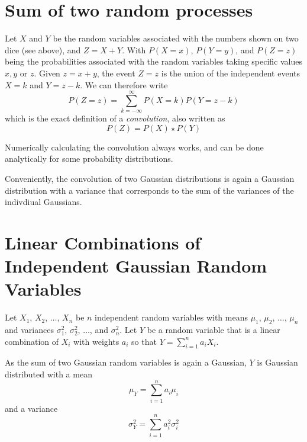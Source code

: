 \section{Sum of two random processes}\label{sec:convolution}
Let $X$ and $Y$ be the random variables associated with the numbers shown on two dice (see above), and $Z=X+Y$. With $P(X=x)$, $P(Y=y)$, and $P(Z=z)$ being the probabilities associated with the random variables taking specific values $x,y$ or $z$. Given $z=x+y$, the event $Z=z$ is the union of the independent events $X=k$ and $Y=z-k$. We can therefore write
\begin{equation}
P(Z=z)=\sum_{k=-\infty}^{\infty}P(X=k)P(Y=z-k)
\end{equation}
which is the exact definition of a \emph{convolution}, also written as
\begin{equation}
P(Z)=P(X)\star P(Y)
\end{equation}

Numerically calculating the convolution always works, and can be done analytically for some probability distributions.

Conveniently, the convolution of two Gaussian distributions is again a Gaussian distribution with a variance that corresponds to the sum of the variances of the indivdiual Gaussians.

\section{Linear Combinations of Independent Gaussian Random Variables}\label{sec:lcombrandom}
Let $X_1$, $X_2$, $\ldots$, $X_n$ be $n$ independent random variables with means $\mu_1$, $\mu_2$, $\ldots$, $\mu_n$ and variances $\sigma_1^2$, $\sigma_2^2$, $\ldots$, and $\sigma^2_n$. Let $Y$ be a random variable that is a linear combination of $X_i$ with weights $a_i$ so that $Y=\sum_{i=1}^na_iX_i$.

As the sum of two Gaussian random variables is again a Gaussian, $Y$ is Gaussian distributed with a mean \begin{equation}
\mu_Y=\sum_{i=1}^na_i\mu_i
\end{equation}
and a variance
\begin{equation}
\sigma_Y^2=\sum_{i=1}^na_i^2\sigma_i^2
\end{equation}




